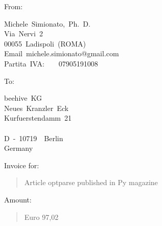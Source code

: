 \documentclass[10pt,english]{article}
\title{}
\author{}
\date{}
\newlength{\locallinewidth}
\begin{document}
\maketitle


\setlength{\locallinewidth}{\linewidth}

From:
\begin{ttfamily}\begin{flushleft}
\mbox{Michele~Simionato,~Ph.~D.}\\
\mbox{Via~Nervi~2}\\
\mbox{00055~Ladispoli~(ROMA)}\\
\mbox{Email~michele.simionato@gmail.com}\\
\mbox{Partita~IVA:~~~~07905191008}
\end{flushleft}\end{ttfamily}

To:
\begin{ttfamily}\begin{flushleft}
\mbox{beehive~KG}\\
\mbox{Neues~Kranzler~Eck}\\
\mbox{Kurfuerstendamm~21}\\
\mbox{}\\
\mbox{D~-~10719~~Berlin}\\
\mbox{Germany}
\end{flushleft}\end{ttfamily}

Invoice for:
\begin{quote}

Article optparse published in Py magazine
\end{quote}

Amount:
\begin{quote}

Euro 97,02
\end{quote}
\end{document}
